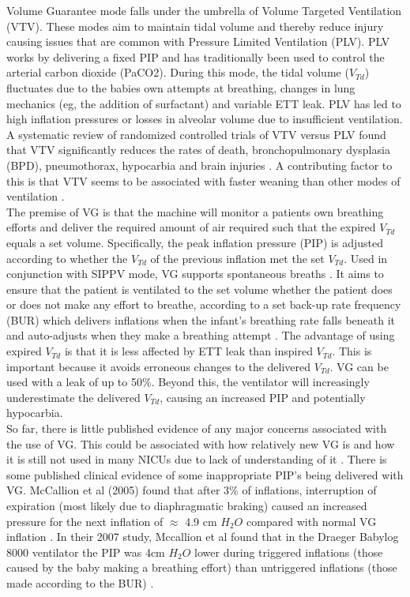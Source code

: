 \documentclass[12pt, openany, oneside]{book}
\begin{document}
Volume Guarantee mode falls under the umbrella of Volume Targeted Ventilation (VTV). These modes aim to maintain tidal volume and thereby reduce injury causing issues that are common with Pressure Limited Ventilation (PLV). PLV works by delivering a fixed PIP and has traditionally been used to control the arterial carbon dioxide (PaCO2). During this mode, the tidal volume ($V_{Td}$) fluctuates due to the babies own attempts at breathing, changes in lung mechanics (eg, the addition of surfactant) and variable ETT leak. PLV has led to high inflation pressures or losses in alveolar volume due to insufficient ventilation. A systematic review of randomized controlled trials of VTV versus PLV found that VTV significantly reduces the rates of death, bronchopulmonary dysplasia (BPD), pneumothorax, hypocarbia and brain injuries \cite{practical}. A contributing factor to this is that VTV seems to be associated with faster weaning than other modes of ventilation \cite{evidence}.\\
 

The premise of VG is that the machine will monitor a patients own breathing efforts and deliver the required amount of air required such that the expired $V_{Td}$ equals a set volume. Specifically, the peak inflation pressure (PIP)  is adjusted according to whether the $V_{Td}$ of the previous inflation met the set $V_{Td}$. Used in conjunction with SIPPV mode, VG supports spontaneous breaths \cite{practical}. It aims to ensure that the patient is ventilated to the set volume whether the patient does or does not make any effort to breathe, according to a set back-up rate frequency (BUR) which delivers inflations when the infant's breathing rate falls beneath it and auto-adjusts when they make a breathing attempt \cite{mccallion2008}. The advantage of using expired $V_{Td}$ is that it is less affected by ETT leak than inspired $V_{Td}$. This is important because it avoids erroneous changes to the delivered $V_{Td}$. VG can be used with a leak of up to 50$\%$. Beyond this, the ventilator will increasingly underestimate the delivered $V_{Td}$, causing an increased PIP and potentially hypocarbia.\\

So far, there is little published evidence of any major concerns associated with the use of VG. This could be associated with how relatively new VG is and how it is still not used in many NICUs due to lack of understanding of it \cite{muzza}. There is some published clinical evidence of some inappropriate PIP's being delivered with VG. McCallion et al (2005) found that after 3$\%$ of inflations, interruption of expiration (most likely due to diaphragmatic braking) caused an increased pressure for the next inflation of $\approx$ 4.9 cm $H_{2}O$ compared with normal VG inflation \cite{mccallion2005}. In their 2007 study, Mccallion et al found that in the Draeger Babylog 8000 ventilator the PIP was 4cm $H_{2}O$ lower during triggered inflations (those caused by the baby making a breathing effort) than untriggered inflations (those made according to the BUR) \cite{mccallion2008}.\\
\end{document}

